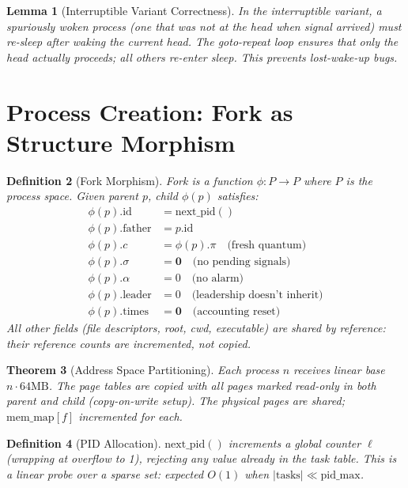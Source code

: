 \documentclass[11pt]{article}
\newtheorem{theorem}{Theorem}[section]
\newtheorem{definition}[theorem]{Definition}
\newtheorem{lemma}[theorem]{Lemma}
\begin{document}
\begin{lemma}[Interruptible Variant Correctness]
In the interruptible variant, a spuriously woken process (one that was
not at the head when signal arrived) must re-sleep after waking the
current head. The goto-repeat loop ensures that only the head
actually proceeds; all others re-enter sleep. This prevents
lost-wake-up bugs.
\end{lemma}


\section{Process Creation: Fork as Structure Morphism}

\begin{definition}[Fork Morphism]
Fork is a function $\phi: P \to P$ where $P$ is the process space.
Given parent $p$, child $\phi(p)$ satisfies:
\begin{align}
\phi(p).\text{id}   &= \text{next\_pid}() \\
\phi(p).\text{father} &= p.\text{id} \\
\phi(p).c            &= \phi(p).\pi  \quad\text{(fresh quantum)} \\
\phi(p).\sigma       &= \mathbf{0}   \quad\text{(no pending signals)} \\
\phi(p).\alpha       &= 0            \quad\text{(no alarm)} \\
\phi(p).\text{leader} &= 0           \quad\text{(leadership doesn't inherit)} \\
\phi(p).\text{times}  &= \mathbf{0}  \quad\text{(accounting reset)}
\end{align}
All other fields (file descriptors, root, cwd, executable) are
\emph{shared by reference}: their reference counts are incremented,
not copied.
\end{definition}

\begin{theorem}[Address Space Partitioning]
Each process $n$ receives linear base $n \cdot 64\text{MB}$.
The page tables are copied with all pages marked read-only
in both parent and child (copy-on-write setup).
The physical pages are shared; $\text{mem\_map}[f]$ incremented for each.
\end{theorem}

\begin{definition}[PID Allocation]
$\text{next\_pid}()$ increments a global counter $\ell$ (wrapping at overflow
to 1), rejecting any value already in the task table.
This is a linear probe over a sparse set: expected $O(1)$ when
$|\text{tasks}| \ll \text{pid\_max}$.
\end{definition}
\end{document}
